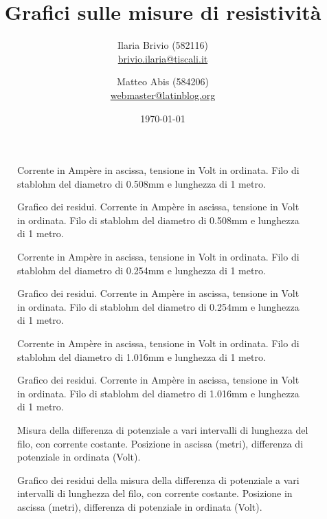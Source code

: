 \documentclass[italian,a4paper]{article}
\begin{document}
\title{Grafici sulle misure di resistività}
\author{\normalsize Ilaria Brivio (582116)\\%
\normalsize \url{brivio.ilaria@tiscali.it}%
\and %
\normalsize Matteo Abis (584206)\\ %
\normalsize \url{webmaster@latinblog.org}}
\date{\today}
\maketitle
\begin{figure}[p]\caption{Corrente in Ampère in ascissa, tensione in Volt in ordinata. Filo di stablohm del diametro di 0.508mm e lunghezza di 1 metro.}
\centering

\end{figure}
\begin{figure}[p]\caption{Grafico dei residui. Corrente in Ampère in ascissa, tensione in Volt in ordinata. Filo di stablohm del diametro di 0.508mm e lunghezza di 1 metro.}
\centering

\end{figure}
\begin{figure}[p]\caption{Corrente in Ampère in ascissa, tensione in Volt in ordinata. Filo di stablohm del diametro di 0.254mm e lunghezza di 1 metro.}
\centering

\end{figure}
\begin{figure}[p]\caption{Grafico dei residui. Corrente in Ampère in ascissa, tensione in Volt in ordinata. Filo di stablohm del diametro di 0.254mm e lunghezza di 1 metro.}
\centering

\end{figure}
\begin{figure}[p]\caption{Corrente in Ampère in ascissa, tensione in Volt in ordinata. Filo di stablohm del diametro di 1.016mm e lunghezza di 1 metro.}
\centering

\end{figure}
\begin{figure}[p]\caption{Grafico dei residui. Corrente in Ampère in ascissa, tensione in Volt in ordinata. Filo di stablohm del diametro di 1.016mm e lunghezza di 1 metro.}
\centering

\end{figure}
\begin{figure}[p]\caption{Misura della differenza di potenziale a vari intervalli di lunghezza del filo, con corrente costante. Posizione in ascissa (metri), differenza di potenziale in ordinata (Volt).}
\centering

\end{figure}
\begin{figure}[p]\caption{Grafico dei residui della misura della differenza di potenziale a vari intervalli di lunghezza del filo, con corrente costante. Posizione in ascissa (metri), differenza di potenziale in ordinata (Volt).}
\centering

\end{figure}
\end{document}
